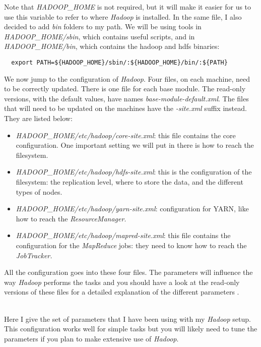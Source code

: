 \documentclass[a4paper, 12pt]{article}
\begin{document}
Note that \textit{HADOOP\_HOME} is not required, but it will make it easier for us to use this variable to refer to where \textit{Hadoop} is installed.  In the same file, I also decided to add \textit{bin} folders to my path. We will be using tools in \textit{HADOOP\_HOME/sbin}, which contains useful scripts, and in \textit{HADOOP\_HOME/bin}, which contains the hadoop and hdfs binaries:

\begin{verbatim}
  export PATH=${HADOOP_HOME}/sbin/:${HADOOP_HOME}/bin/:${PATH}
\end{verbatim}

We now jump to the configuration of \textit{Hadoop}. Four files, on each machine, need to be correctly updated. There is one file for each base module. The read-only versions, with the default values, have names \textit{base-module-default.xml}. The files that will need to be updated on the machines have the \textit{-site.xml} suffix instead. They are listed below:
\begin{itemize}
  \item \textit{HADOOP\_HOME/etc/hadoop/core-site.xml}: this file contains the core configuration. One important setting we will put in there is how to reach the filesystem.
  \item \textit{HADOOP\_HOME/etc/hadoop/hdfs-site.xml}: this is the configuration of the filesystem: the replication level, where to store the data, and the different types of nodes.
  \item \textit{HADOOP\_HOME/etc/hadoop/yarn-site.xml}: configuration for YARN, like how to reach the \textit{ResourceManager}.
  \item \textit{HADOOP\_HOME/etc/hadoop/mapred-site.xml}: this file contains the configuration for the \textit{MapReduce} jobs: they need to know how to reach the \textit{JobTracker.}
\end{itemize}

All the configuration goes into these four files. The parameters will influence the way \textit{Hadoop} performs the tasks and you should have a look at the read-only versions of these files for a detailed explanation of the different parameters \cite{hadoop_core_default} \cite{hadoop_hdfs_default} \cite{hadoop_yarn_default} \cite{hadoop_mapred_default}.

~\\
Here I give the set of parameters that I have been using with my \textit{Hadoop} setup. This configuration works well for simple tasks but you will likely need to tune the parameters if you plan to make extensive use of \textit{Hadoop}.
\end{document}
